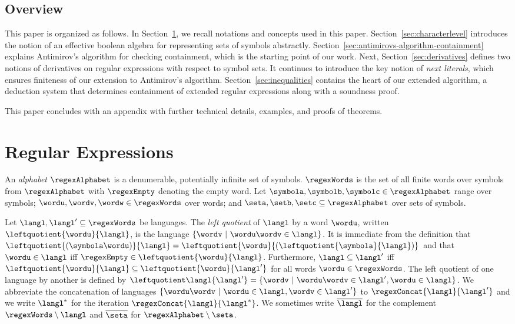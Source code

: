 \subsection{Overview}
This paper is organized as follows. In Section~\ref{sec:preliminaries}, we recall notations and concepts used in this
paper. Section~\ref{sec:characterlevel} introduces the notion of an effective boolean algebra for representing sets of
symbols abstractly. Section~\ref{sec:antimirovs-algorithm-containment} explains Antimirov's algorithm for checking
containment, which is the starting point of our work. Next, Section~\ref{sec:derivatives} defines two notions of
derivatives on regular expressions with respect to symbol sets. It continues to introduce the key notion of \emph{next
literals}, which ensures finiteness of our extension to Antimirov's algorithm. Section~\ref{sec:inequalities} contains
the heart of our extended algorithm, a deduction system that determines containment of extended regular expressions
along with a soundness proof.



This paper concludes with an appendix
with further technical details, examples, and proofs of theorems.



\section{Regular Expressions}
\label{sec:preliminaries}

An \emph{alphabet} $\regexAlphabet$ is a denumerable, potentially infinite set of
symbols. $\regexWords$ is the set of all finite words over symbols from
$\regexAlphabet$ with $\regexEmpty$ denoting the empty word.
Let $\symbola,\symbolb,\symbolc\in\regexAlphabet$
range over symbols; $\wordu,\wordv,\wordw\in\regexWords$ over words;
and
$\seta,\setb,\setc\subseteq\regexAlphabet$ over sets of symbols. 


Let $\langl, \langl'\subseteq\regexWords$ be languages.
The \emph{left quotient} of $\langl$ by a word $\wordu$, written
$\leftquotient{\wordu}{\langl}$, is the language $\{
\wordv~|~\wordu\wordv\in\langl \}$. It is immediate from the
definition that $\leftquotient{(\symbola\wordu)}{\langl} =
\leftquotient{\wordu}{(\leftquotient{\symbola}{\langl})}$ and that 
$\wordu\in\langl$ iff
$\regexEmpty\in\leftquotient{\wordu}{\langl}$. Furthermore,
$\langl\subseteq\langl'$ iff
$\leftquotient{\wordu}{\langl}\subseteq\leftquotient{\wordu}{\langl'}$
for all words $\wordu\in\regexWords$. The left quotient of one
language by another is defined by  $\leftquotient\langl{\langl'} = \{
\wordv~|~\wordu\wordv\in\langl', \wordu\in\langl \}$.
We abbreviate the concatenation of languages $\{\wordu\wordv~|~\wordu\in\langl,\wordv\in\langl'\}$
to $\regexConcat{\langl}{\langl'}$ and we write $\langl^*$ for the iteration $\regexConcat{\langl}{\langl^*}$.
We sometimes write $\overline\langl$ for the complement $\regexWords\setminus\langl$ and  
$\overline\seta$ for $\regexAlphabet\setminus\seta$.

